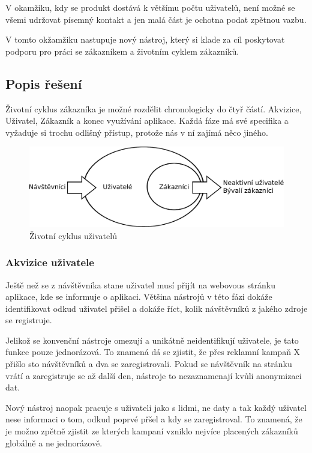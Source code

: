 \documentclass[bc,female,java,dept456]{diploma}						%
\begin{document}
V okamžiku, kdy se produkt dostává k většímu počtu uživatelů, není možné se všemi udržovat písemný kontakt a jen malá část je ochotna podat zpětnou vazbu. 

V tomto okžamžiku nastupuje nový nástroj, který si klade za cíl poskytovat podporu pro práci se zákazníkem a životním cyklem zákazníků.


\subsection{Popis řešení} %

Životní cyklus zákazníka je možné rozdělit chronologicky do čtyř částí. Akvizice, Uživatel, Zákazník a konec využívání aplikace. Každá fáze má své specifika a vyžaduje si trochu odlišný přístup, protože nás v ní zajímá něco jiného.

\begin{figure}[h]
	\centering
	\includegraphics[width=14cm]{img/user_lifecycle_slim.pdf}
	\caption{Životní cyklus uživatelů}
	\label{lifecycle}
\end{figure}

\subsubsection{Akvizice uživatele}

Ještě než se z návštěvníka stane uživatel musí přijít na webovous stránku aplikace, kde se informuje o aplikaci. Většina nástrojů v této fázi dokáže identifikovat odkud uživatel přišel a dokáže říct, kolik návštěvníků z jakého zdroje se registruje.

Jelikož se konvenční nástroje omezují a unikátně neidentifikují uživatele, je tato funkce pouze jednorázová. To znamená dá se zjistit, že přes reklamní kampaň X přišlo sto návštěvníků a dva se zaregistrovali. Pokud se návštěvník na stránku vrátí a zaregistruje se až další den, nástroje to nezaznamenají kvůli anonymizaci dat.

Nový nástroj naopak pracuje s uživateli jako s lidmi, ne daty a tak každý uživatel nese informaci o tom, odkud poprvé přšel a kdy se zaregistroval. To znamená, že je možno zpětně zjistit ze kterých kampaní vzniklo nejvíce placených zákazníků globálně a ne jednorázově.
\end{document}
